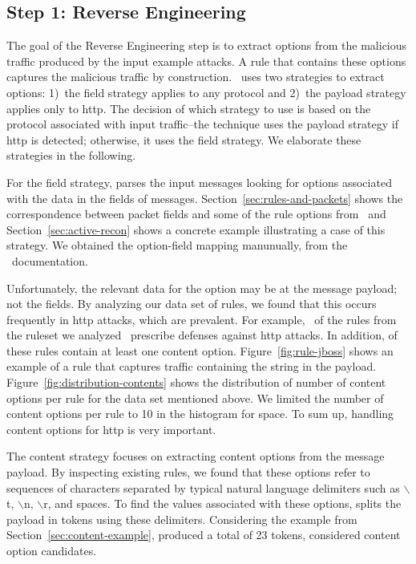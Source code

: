 \documentclass[sigconf,review, anonymous]{acmart}
\begin{document}
\subsection{Step 1: Reverse Engineering}
\label{sec:reverse-engineering}

The goal of the Reverse Engineering step is to extract options from
the malicious traffic produced by the input example attacks. A rule
that contains these options captures the malicious traffic by
construction. \tname\ uses two strategies to extract options: 1)~the
field strategy applies to any protocol and 2)~the payload strategy
applies only to http.  The decision of which strategy to use is based
on the protocol associated with input traffic--the technique uses the
payload strategy if http is detected; otherwise, it uses the field
strategy. We elaborate these strategies in the following.

For the field strategy, \tname{} parses the input messages looking for
options associated with the data in the fields of
messages. Section~\ref{sec:rules-and-packets} shows the correspondence
between packet fields and some of the rule options from \suri\ and
Section~\ref{sec:active-recon} shows a concrete example illustrating a
case of this strategy. We obtained the option-field mapping
manunually, from the \suri\ documentation.

Unfortunately, the relevant data for the option may be at the message
payload; not the fields. By analyzing our data set of rules, we found
that this occurs frequently in http attacks, which are prevalent. For
example, \percHttp\ of the \numrulessuri{} rules from the ruleset we
analyzed~\cite{emerging-threats-open} prescribe defenses against http
attacks. In addition, \percRulesWithContent{} of these rules contain
at least one content option. Figure~\ref{fig:rule-jboss} shows an
example of a rule that captures traffic containing the string
 in the payload.
Figure~\ref{fig:distribution-contents} shows the distribution of
number of content options per rule for the data set mentioned
above. We limited the number of content options per rule to 10 in the
histogram for space.   To sum up, handling content options for
http is very important.

The content strategy focuses on extracting content options from the
message payload. By inspecting existing rules, we found that these
options refer to sequences of characters separated by typical natural
language delimiters such as $\backslash$t, $\backslash$n,
$\backslash$r, and spaces. To find the values associated with these
options, \tname{} splits the payload in tokens using these delimiters.
Considering the example from Section~\ref{sec:content-example},
\tname{} produced a total of 23 tokens, considered content
option candidates.
\end{document}
